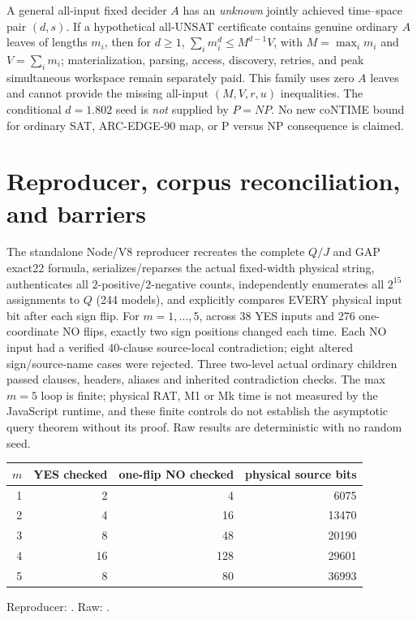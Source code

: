 \documentclass[11pt]{article}
\begin{document}
A general all-input fixed decider $A$ has an \emph{unknown} jointly
achieved time--space pair $(d,s)$.
If a hypothetical all-UNSAT certificate contains genuine ordinary
$A$ leaves of lengths $m_i$, then for $d\ge1$,
$\sum_i m_i^d\le M^{d-1}V$, with $M=\max_i m_i$ and $V=\sum_i m_i$;
materialization, parsing, access, discovery, retries, and peak
simultaneous workspace remain separately paid. This family uses
zero $A$ leaves and cannot provide the missing all-input
$(M,V,r,u)$ inequalities. The conditional $d=1.802$ seed
is \emph{not} supplied by $P=NP$. No new coNTIME bound for ordinary
SAT, ARC-EDGE-90 map, or P versus NP consequence is claimed.

\section{Reproducer, corpus reconciliation, and barriers}
The standalone Node/V8 reproducer recreates the complete $Q/J$ and
GAP exact22 formula, serializes/reparses the actual fixed-width
physical string, authenticates all $2$-positive/$2$-negative counts,
independently enumerates all $2^{15}$ assignments to $Q$ (244 models),
and explicitly compares EVERY physical input bit after each sign flip.
For $m=1,\ldots,5$, across 38 YES inputs and 276 one-coordinate
NO flips, exactly two sign positions changed each time.
Each NO input had a verified 40-clause source-local contradiction;
eight altered sign/source-name cases were rejected.
Three two-level actual ordinary children passed clauses,
headers, aliases and inherited contradiction checks.
The max $m=5$ loop is finite; physical RAT, M1 or Mk time is not
measured by the JavaScript runtime, and these finite controls
do not establish the asymptotic query theorem without its proof.
Raw results are deterministic with no random seed.
\begin{center}
\begin{tabular}{rrrr}
\toprule
$m$&YES checked&one-flip NO checked&physical source bits\\
\midrule
1&2&4&6075\\
2&4&16&13470\\
3&8&48&20190\\
4&16&128&29601\\
5&8&80&36993\\
\bottomrule
\end{tabular}
\end{center}
Reproducer:
.
Raw:
.
\end{document}

